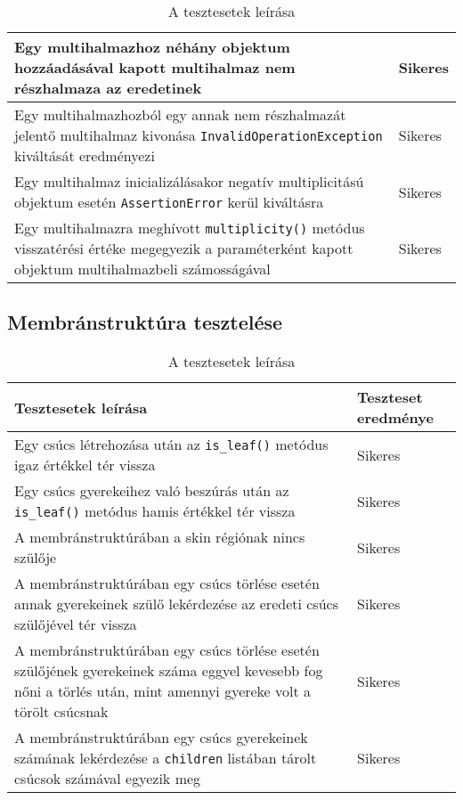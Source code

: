 \begin{table}[H]
\begin{tabular}{ | m{} | m{} | }
		Egy multihalmazhoz néhány objektum hozzáadásával kapott multihalmaz nem részhalmaza az eredetinek &  Sikeres \\
		\hline
		
				Egy multihalmazhozból egy annak nem részhalmazát jelentő multihalmaz kivonása \verb|InvalidOperationException| kiváltását eredményezi &  Sikeres \\
		\hline
		
		
		Egy multihalmaz inicializálásakor negatív multiplicitású objektum esetén \verb|AssertionError| kerül kiváltásra &  Sikeres \\
		\hline
		
		Egy multihalmazra meghívott \verb|multiplicity()| metódus visszatérési értéke megegyezik a paraméterként kapott objektum multihalmazbeli számosságával &  Sikeres \\
		\hline
		
	\end{tabular}
	\caption{A tesztesetek leírása}
	\label{tab:test_cases_multiset}
\end{table}

\subsection{Membránstruktúra tesztelése}

\begin{table}[H]
	\centering
	\begin{tabular}{ | m{} | m{} | }
		\hline
		\textbf{Tesztesetek leírása} & \textbf{Teszteset eredménye} \\
		\hline \hline
		Egy csúcs létrehozása után az \verb|is_leaf()| metódus igaz értékkel tér vissza & Sikeres \\
		\hline
		Egy csúcs gyerekeihez való beszúrás után az \verb|is_leaf()| metódus hamis értékkel tér vissza & Sikeres \\
		\hline
		
		A membránstruktúrában a skin régiónak nincs szülője & Sikeres \\
		\hline
		
		A membránstruktúrában egy csúcs törlése esetén annak gyerekeinek szülő lekérdezése az eredeti csúcs szülőjével tér vissza & Sikeres \\
		\hline
	A membránstruktúrában egy csúcs törlése esetén szülőjének gyerekeinek száma eggyel kevesebb fog nőni a törlés után, mint amennyi gyereke volt a törölt csúcsnak & Sikeres \\
		\hline
		
			A membránstruktúrában egy csúcs gyerekeinek számának lekérdezése a \verb|children| listában tárolt csúcsok számával egyezik meg & Sikeres \\
		\hline
	\end{tabular}
	\caption{A tesztesetek leírása}
	\label{tab:test_cases_structure}
\end{table}

